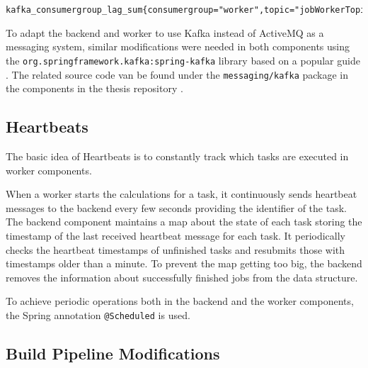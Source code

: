 \vspace{0.5cm}
\begin{minipage}{\linewidth}
	\begin{lstlisting}[caption={Metric for the number of unconsumed messages in Kafka}, label={lst:kafka-consumerlag-metric}]
	kafka_consumergroup_lag_sum{consumergroup="worker",topic="jobWorkerTopic"}\end{lstlisting}
\end{minipage}

To adapt the backend and worker to use Kafka instead of ActiveMQ as a messaging system, similar modifications were needed in both components using the \texttt{org.springframework.kafka:spring-kafka} library based on a popular guide . The related source code van be found under the \texttt{messaging/kafka} package in the components in the thesis repository \cite{ThesisRepo}.

\subsection{Heartbeats}


The basic idea of Heartbeats is to constantly track which tasks are executed in worker components.

When a worker starts the calculations for a task, it continuously sends heartbeat messages to the backend every few seconds providing the identifier of the task. The backend component maintains a map about the state of each task storing the timestamp of the last received heartbeat message for each task. It periodically checks the heartbeat timestamps of unfinished tasks and resubmits those with timestamps older than a minute. To prevent the map getting too big, the backend removes the information about successfully finished jobs from the data structure.

To achieve periodic operations both in the backend and the worker components, the Spring annotation \texttt{@Scheduled} is used.


\subsection{Build Pipeline Modifications} \label{cicd-modifications}

